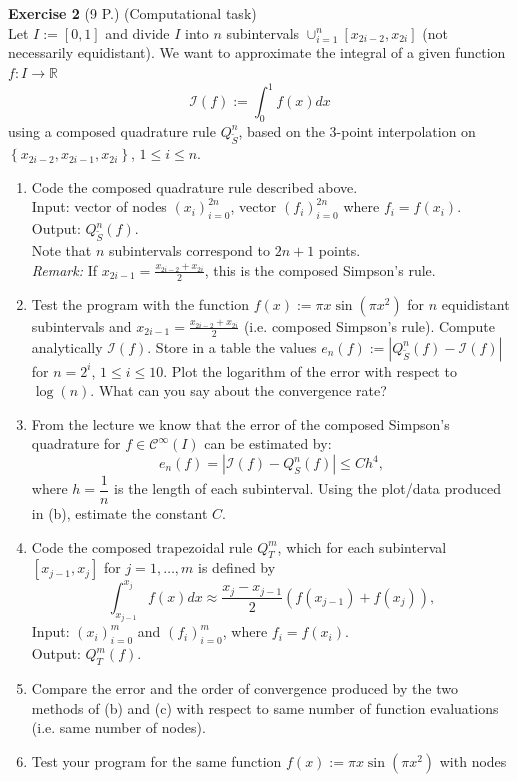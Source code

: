 \documentclass[11pt,a4paper,german]{scrartcl}
\theoremstyle{break}   %
\begin{document}
\textbf{Exercise 2} (9 P.) (Computational task) \\
Let $I:=[0,1]$ and divide $I$ into $n$ subintervals \(\cup_{i=1}^n \left[ x_{2i-2}, x_{2i} \right]\) (not necessarily equidistant). We want to approximate the integral of a given function $f:I\to \mathbb{R}$ 
$$\mathcal{I}(f):=\int_0 ^ 1 f(x)dx
$$
using a composed quadrature rule \(Q_{\tilde{S}}^n\), based on the 3-point interpolation on \(\left\{ x_{2i-2},x_{2i-1}, x_{2i} \right\}\), \(1\leq i \leq n\).
\begin{enumerate}
\item Code the composed quadrature rule described above. \\
Input: vector of nodes \((x_i)_{i=0}^{2n}\), vector \((f_i)_{i=0}^{2n}\) where \(f_i = f(x_i)\).\\ Output: $Q_{\tilde{S}}^n(f)$.\\
Note that $n$ subintervals correspond to $2n+1$ points.\\
\textit{Remark: } If \(x_{2i-1}= \frac{x_{2i-2}+ x_{2i}}{2}\), this is the composed Simpson's rule.
\item Test the program with the function $f(x):=\pi x\sin(\pi x^2)$ for \(n\) equidistant subintervals and \(x_{2i-1}= \frac{x_{2i-2}+ x_{2i}}{2}\) (i.e. composed Simpson's rule). Compute analytically $\mathcal{I}(f)$. Store in a table the values $e_n(f):=|Q_{\tilde{S}}^n(f)-\mathcal{I}(f)|$ for $n=2^i$, $1\leq i \leq 10$. Plot the logarithm of the error with respect to $\log(n)$. What can you say about the convergence rate?
\item From the lecture we know that the error of the composed Simpson's quadrature for $f\in \mathcal{C}^\infty(I)$ can be estimated by:
$$e_n(f)= |\mathcal{I}(f) - Q_S^n(f)| \leq Ch^4,$$
where $h=\dfrac{1}{n}$ is the length of each subinterval.
Using the plot/data produced in (b), estimate the constant $C$.
\item Code the composed trapezoidal rule \(Q_T^m\), which for each subinterval $[x_{j-1},x_j]$ for $j=1,\dots, m$ is defined by
$$
\int_{x_{j-1}}^{x_{j}} f(x) dx \approx  \frac{x_{j}-x_{j-1}}{2} \left( f(x_{j-1}) + f(x_{j}) \right), 
$$
Input: \((x_i)_{i=0}^m\) and \((f_i)_{i=0}^m\), where \(f_i= f(x_i)\).\\
Output: $Q_T^m(f)$.
\item Compare the error and the order of convergence produced by the two methods of (b) and (c) with respect to same number of function evaluations (i.e. same number of nodes).
\item Test your program for the same function $f(x):=\pi x\sin(\pi x^2)$ with nodes

\end{enumerate}
\end{document}
